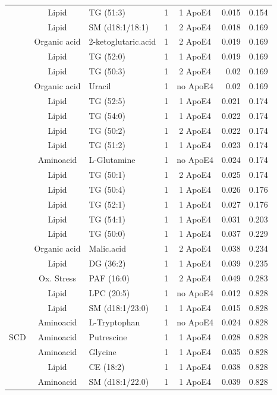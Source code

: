 \documentclass{amsart}
\begin{document}
\begin{table}
{\begin{threeparttable}
\begin{tabular}{cclccrr}
   & Lipid & TG (51:3) & 1 & 1 ApoE4 & 0.015 & 0.154 \\
   & Lipid & SM (d18:1/18:1) & 1 & 2 ApoE4 & 0.018 & 0.169 \\
   & Organic acid & 2-ketoglutaric.acid & 1 & 2 ApoE4 & 0.019 & 0.169 \\
   & Lipid & TG (52:0) & 1 & 1 ApoE4 & 0.019 & 0.169 \\
   & Lipid & TG (50:3) & 1 & 2 ApoE4 & 0.02 & 0.169 \\
   & Organic acid & Uracil & 1 & no ApoE4 & 0.02 & 0.169 \\
   & Lipid & TG (52:5) & 1 & 1 ApoE4 & 0.021 & 0.174 \\
   & Lipid & TG (54:0) & 1 & 1 ApoE4 & 0.022 & 0.174 \\
   & Lipid & TG (50:2) & 1 & 2 ApoE4 & 0.022 & 0.174 \\
   & Lipid & TG (51:2) & 1 & 1 ApoE4 & 0.023 & 0.174 \\
   & Aminoacid & L-Glutamine & 1 & no ApoE4 & 0.024 & 0.174 \\
   & Lipid & TG (50:1) & 1 & 2 ApoE4 & 0.025 & 0.174 \\
   & Lipid & TG (50:4) & 1 & 1 ApoE4 & 0.026 & 0.176 \\
   & Lipid & TG (52:1) & 1 & 1 ApoE4 & 0.027 & 0.176 \\
   & Lipid & TG (54:1) & 1 & 1 ApoE4 & 0.031 & 0.203 \\
   & Lipid & TG (50:0) & 1 & 1 ApoE4 & 0.037 & 0.229 \\
   & Organic acid & Malic.acid & 1 & 2 ApoE4 & 0.038 & 0.234 \\
   & Lipid & DG (36:2) & 1 & 1 ApoE4 & 0.039 & 0.235 \\
   & Ox. Stress & PAF (16:0)& 1 & 2 ApoE4 & 0.049 & 0.283 \\ \midrule
  \multirow{10}{*}{SCD} & Lipid & LPC (20:5) & 1 & no ApoE4 & 0.012 & 0.828 \\
   & Lipid & SM (d18:1/23:0) & 1 & 1 ApoE4 & 0.015 & 0.828 \\
   & Aminoacid & L-Tryptophan & 1 & no ApoE4 & 0.024 & 0.828 \\
   & Aminoacid & Putrescine & 1 & 1 ApoE4 & 0.028 & 0.828 \\
   & Aminoacid & Glycine & 1 & 1 ApoE4 & 0.035 & 0.828 \\
   & Lipid & CE (18:2) & 1 & 1 ApoE4 & 0.038 & 0.828 \\
   & Aminoacid & SM (d18:1/22.0) & 1 & 1 ApoE4 & 0.039 & 0.828 \\

\end{tabular}
\end{threeparttable}}
\end{table}
\end{document}
